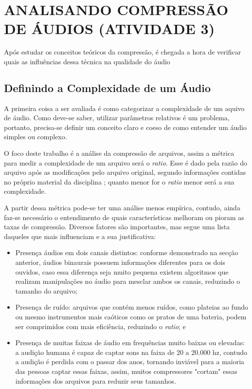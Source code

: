 \captionsetup{justification=centering,margin=0cm}

\chapter[ANALISANDO COMPRESSÃO DE ÁUDIOS (ATIVIDADE 3)]{ANALISANDO COMPRESSÃO DE ÁUDIOS (ATIVIDADE 3)}
Após estudar os conceitos teóricos da compressão, é chegada a hora de verificar quais as influências dessa técnica na qualidade do áudio

\section{Definindo a Complexidade de um Áudio}
A primeira coisa a ser avaliada é como categorizar a complexidade de um aquivo de áudio. Como deve-se saber, utilizar parâmetros relativos é um problema, portanto, precisa-se definir um conceito claro e coeso de como entender um áudio simples ou complexo.

\hspace{1.5 cm} O foco deste trabalho é a análise da compressão de arquivos, assim a métrica para medir a complexidade de um arquivo será o \textit{ratio}. Esse é dado pela razão do arquivo após as modificações pelo arquivo original, segundo informações contidas no próprio material da disciplina \cite{FlavioGiraldeli}; quanto menor for o \textit{ratio} menor será a sua complexidade.

\hspace{1.5 cm} A partir dessa métrica pode-se ter uma análise menos empírica, contudo, ainda faz-se necessário o entendimento de quais características melhoram ou pioram as taxas de compressão. Diversos fatores são importantes, mas segue uma lista daqueles que mais influenciam e a sua justificativa:

\begin{itemize}
    \item Presença áudios em dois canais distintos: conforme demonstrado na secção anterior, áudios binaurais possuem informações diferentes para os dois ouvidos, caso essa diferença seja muito pequena existem algoritmos que realizam manipulações no áudio para mesclar ambos os canais, reduzindo o tamanho do arquivo;
    \item Presença de ruído: arquivos que contém menos ruídos, como plateias ao fundo ou mesmo instrumentos mais caóticos como os pratos de uma bateria, podem ser comprimidos com mais eficiência, reduzindo o \textit{ratio}; e
    \item Presença de muitas faixas de áudio em frequências muito baixas ou elevadas: a audição humana é capaz de captar sons na faixa de 20 a 20.000 hz, contudo a audição é perdida com o passar dos anos, tornando inviável para a maioria das pessoas captar essas faixas, assim, muitos compressores "cortam" essas informações dos arquivos para reduzir seus tamanhos. 
\end{itemize}

